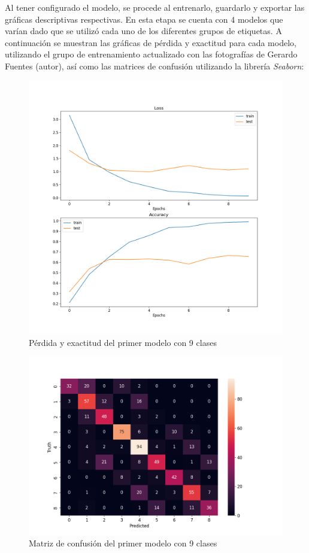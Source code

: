 Al tener configurado el modelo, se procede al entrenarlo, guardarlo y exportar las gráficas descriptivas respectivas. En esta etapa se cuenta con 4 modelos que varían dado que se utilizó cada uno de los diferentes grupos de etiquetas. A continuación se muestran las gráficas de pérdida y exactitud para cada modelo, utilizando el grupo de entrenamiento actualizado con las fotografías de Gerardo Fuentes (autor), así como las matrices de confusión utilizando la librería \textit{Seaborn}:

\begin{figure}[H]
	\centering
	\includegraphics[scale=0.65]{figures/LA0.png}
	\caption{Pérdida y exactitud del primer modelo con 9 clases}
	\label{fig:img9}
\end{figure}

\begin{figure}[H]
	\centering
	\includegraphics[scale=0.75]{figures/CM0.png}
	\caption{Matriz de confusión del primer modelo con 9 clases}
	\label{fig:img10}
\end{figure}

